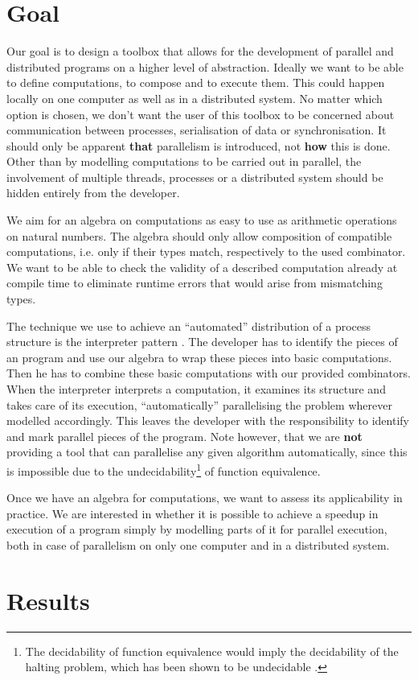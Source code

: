 \section{Goal}
\label{chp:goal}
Our goal is to design a toolbox that allows for the development of parallel and distributed programs on a higher level of abstraction. Ideally we want to be able to define computations, to compose and to execute them. This could happen locally on one computer as well as in a distributed system. No matter which option is chosen, we don't want the user of this toolbox to be concerned about communication between processes, serialisation of data or synchronisation. It should only be apparent \textbf{that} parallelism is introduced, not \textbf{how} this is done. Other than by modelling computations to be carried out in parallel, the involvement of multiple threads, processes or a distributed system should be hidden entirely from the developer.

We aim for an algebra on computations as easy to use as arithmetic operations on natural numbers. The algebra should only allow composition of compatible computations, i.e. only if their types match, respectively to the used combinator. We want to be able to check the validity of a described computation already at compile time to eliminate runtime errors that would arise from mismatching types.

The technique we use to achieve an \enquote{automated} distribution of a process structure is the interpreter pattern \cite{Gamma:1995:DPE:186897}. The developer has to identify the pieces of an program and use our algebra to wrap these pieces into basic computations. Then he has to combine these basic computations with our provided combinators. When the interpreter interprets a computation, it examines its structure and takes care of its execution, \enquote{automatically} parallelising the problem wherever modelled accordingly. This leaves the developer with the responsibility to identify and mark parallel pieces of the program. Note however, that we are \textbf{not} providing a tool that can parallelise any given algorithm automatically, since this is impossible due to the undecidability\footnote{The decidability of function equivalence would imply the decidability of the halting problem, which has been shown to be undecidable \citep{Garey:1979:CIG:578533}.} of function equivalence.

Once we have an algebra for computations, we want to assess its applicability in practice. We are interested in whether it is possible to achieve a speedup in execution of a program simply by modelling parts of it for parallel execution, both in case of parallelism on only one computer and in a distributed system.

\section{Results}
\lipsum[1-6]
